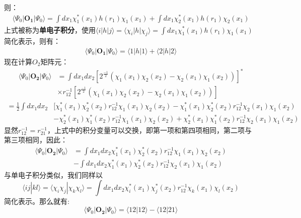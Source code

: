 \documentclass[12pt, a4paper, oneside]{ctexart}
\begin{document}
则：
\begin{equation}
\begin{aligned}
\langle\Psi_0|\mathbf{O_1}|\Psi_0\rangle=\int dx_1\chi_1^*(x_1)h(r_1)\chi_1(x_1)+\int dx_1\chi_2^*(x_1)h(r_1)\chi_2(x_1)
\end{aligned}
\end{equation}
上式被称为\textbf{单电子积分}，使用$\langle i|h|j\rangle=\langle\chi_i|h|\chi_j\rangle=\int dx_1\chi_1^*(x_1)h(r_1)\chi_1(x_1)$简化表示，则有：
\begin{equation}
\begin{aligned}
\langle\Psi_0|\mathbf{O_1}|\Psi_0\rangle=\langle1|h|1\rangle+\langle 2|h|2\rangle
\end{aligned}
\end{equation}
现在计算$O_2$矩阵元：
\begin{equation}
\begin{aligned}
\langle\Psi_0|\mathbf{O_2}|\Psi_0\rangle&=\int dx_1dx_2[2^{\frac{-1}{2}}(\chi_1(x_1)\chi_2(x_2)-\chi_2(x_1)\chi_1(x_2))]^*\\
								&\times r_{12}^{-1}[2^{\frac{-1}{2}}(\chi_1(x_1)\chi_2(x_2)-\chi_2(x_1)\chi_1(x_2))]
\end{aligned}
\end{equation}
\begin{equation}
\begin{aligned}
=\frac12\int dx_1dx_2&[\chi_1^*(x_1)\chi_2^*(x_2)r_{12}^{-1}\chi_1(x_1)\chi_2(x_2)-\chi_1^*(x_1)\chi_2^*(x_2)r_{12}^{-1}\chi_2(x_1)\chi_1(x_2)\\
&-\chi_2^*(x_1)\chi_1^*(x_2)r_{12}^{-1}\chi_1(x_1)\chi_2(x_2)+\chi_2^*(x_1)\chi_1^*(x_2)r_{12}^{-1}\chi_2(x_1)\chi_1(x_2)
\end{aligned}
\end{equation}
显然$r_{12}^{-1}=r_{21}^{-1}$，上式中的积分变量可以交换，即第一项和第四项相同，第二项与第三项相同，因此：
\begin{equation}
\begin{aligned}
\langle\Psi_0|\mathbf{O_2}|\Psi_0\rangle&=\int dx_1dx_2\chi_1^*(x_1)\chi_2^*(x_2)r_{12}^{-1}\chi_1(x_1)\chi_2(x_2)\\
&-\int dx_1dx_2\chi_1^*(x_1)\chi_2^*(x_2)r_{12}^{-1}\chi_2(x_1)\chi_1(x_2)
\end{aligned}
\end{equation}
与单电子积分类似，我们同样以$$\langle ij|kl\rangle=\langle\chi_i\chi_j|\chi_k\chi_l\rangle=\int dx_1dx_2\chi_i^*(x_1)\chi_j^*(x_2)r_{12}^{-1}\chi_k(x_1)\chi_l(x_2)$$简化表示。那么就有:
\begin{equation}
\langle\Psi_0|\mathbf{O_2}|\Psi_0\rangle=\langle 12|12\rangle-\langle 12|21\rangle
\end{equation}
\end{document}
